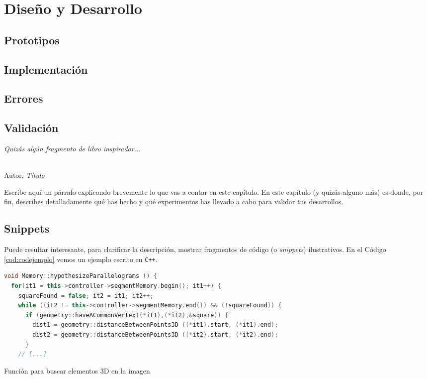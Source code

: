 \chapter{Diseño y Desarrollo}
\label{cap:capitulo5}

\section{Prototipos}

\section{Implementación}

\section{Errores}

\section{Validación}

\begin{flushright}
\begin{minipage}[]{10cm}
\emph{Quizás algún fragmento de libro inspirador...}\\
\end{minipage}\\

Autor, \textit{Título}\\
\end{flushright}

\vspace{1cm}

Escribe aquí un párrafo explicando brevemente lo que vas a contar en este capítulo. En este capítulo (y quizás alguno más) es donde, por fin, describes detalladamente qué has hecho y qué experimentos has llevado a cabo para validar tus desarrollos.

\section{Snippets}

Puede resultar interesante, para clarificar la descripción, mostrar fragmentos de código (o \textit{snippets}) ilustrativos. En el Código \ref{cod:codejemplo} vemos un ejemplo escrito en \texttt{C++}.

\begin{code}[h]
\begin{lstlisting}[language=C++]
void Memory::hypothesizeParallelograms () {
  for(it1 = this->controller->segmentMemory.begin(); it1++) {
    squareFound = false; it2 = it1; it2++;
    while ((it2 != this->controller->segmentMemory.end()) && (!squareFound)) {
      if (geometry::haveACommonVertex((*it1),(*it2),&square)) {
        dist1 = geometry::distanceBetweenPoints3D ((*it1).start, (*it1).end);
        dist2 = geometry::distanceBetweenPoints3D ((*it2).start, (*it2).end);
      }
    // [...]
\end{lstlisting}
\caption[Función para buscar elementos 3D en la imagen]{Función para buscar elementos 3D en la imagen}
\label{cod:codejemplo}
\end{code}

